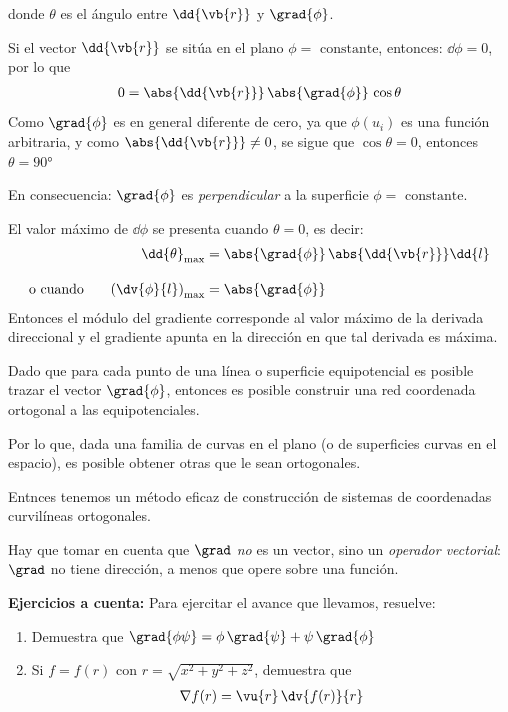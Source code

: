 donde $\theta$ es el ángulo entre $\dd{\vb{r}}$ y $\grad{\phi}$.
\par
Si el vector $\dd{\vb{r}}$ se sitúa en el plano $\phi = \mbox{ constante}$, entonces: $\dd{\phi} = 0$, por lo que
\begin{align*}
0 = \abs{\dd{\vb{r}}} \, \abs{\grad{\phi}} \, \cos \theta
\end{align*}
Como $\grad{\phi}$ es en general diferente de cero, ya que $\phi(u_{i})$ es una función arbitraria, y como $\abs{\dd{\vb{r}}} \neq 0$, se sigue que $\cos \theta = 0$, entonces $\theta = \ang{90}$
\par
En consecuencia: $\grad{\phi}$ es \emph{perpendicular} a la superficie $\phi = \mbox{ constante}$.
\par
El valor máximo de $\dd{\phi}$ se presenta cuando $\theta = 0$, es decir:
\begin{align*}
\dd{\theta}_{\max} &= \abs{\grad{\phi}} \, \abs{\dd{\vb{r}}} \dd{l} \\[1em]
\mbox{o cuando } \hspace{0.5cm} \left( \dv{\phi}{l} \right)_{\max} &= \abs{\grad{\phi}}
\end{align*}
Entonces el módulo del gradiente corresponde al valor máximo de la derivada direccional y el gradiente apunta en la dirección en que tal derivada es máxima.
\par
Dado que para cada punto de una línea o superficie equipotencial es posible trazar el vector $\grad{\phi}$, entonces es posible construir una red coordenada ortogonal a las equipotenciales.
\par
Por lo que, dada una familia de curvas en el plano (o de superficies curvas en el espacio), es posible obtener otras que le sean ortogonales.
\par
Entnces tenemos un método eficaz de construcción de sistemas de coordenadas curvilíneas ortogonales.
\par
Hay que tomar en cuenta que $\grad$ \emph{no} es un vector, sino un \emph{operador vectorial}: $\grad$ no tiene dirección, a menos que opere sobre una función.
\par
\textbf{Ejercicios a cuenta:}
Para ejercitar el avance que llevamos, resuelve:
\begin{enumerate}
\item Demuestra que $\grad{\phi \psi} = \phi \, \grad{\psi} + \psi \, \grad{\phi}$
\item Si $f = f(r)$ con $r = \sqrt{x^{2} + y^{2}+ z^{2}}$, demuestra que
\begin{align*}
\nabla{f(r)} = \vu{r} \, \dv{f(r)}{r}
\end{align*}
\end{enumerate}
